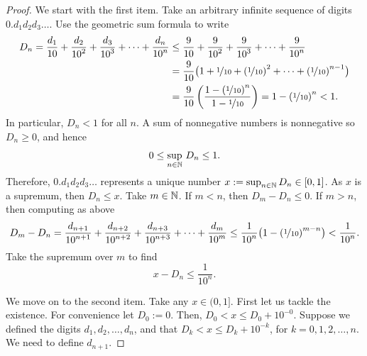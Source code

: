 \begin{proof}
We start with the first item.  Take an arbitrary infinite sequence of
digits $0.d_1d_2d_3\ldots$.  Use the geometric sum formula to write
\begin{equation*}
\begin{split}
D_n =
\frac{d_1}{10} + 
\frac{d_2}{{10}^2} + 
\frac{d_3}{{10}^3} + 
\cdots +
\frac{d_n}{{10}^n} 
& \leq
\frac{9}{10} + 
\frac{9}{{10}^2} + 
\frac{9}{{10}^3} + 
\cdots +
\frac{9}{{10}^n} 
\\
& =
\frac{9}{10}
\bigl( 1 + \nicefrac{1}{10} + 
{(\nicefrac{1}{10})}^2 + \cdots + 
{(\nicefrac{1}{10})}^{n-1} \bigr)
\\
& =
\frac{9}{10}
\left(
\frac{1-{(\nicefrac{1}{10})}^{n}}{1-\nicefrac{1}{10}}
\right)
= 1-{(\nicefrac{1}{10})}^{n}
< 1 .
\end{split}
\end{equation*}
In particular, $D_n < 1$ for all $n$.  A sum of nonnegative numbers is
nonnegative so $D_n \geq 0$, and hence
\begin{equation*}
0 \leq \sup_{n\in {\mathbb{N}}} \, D_n \leq 1 .
\end{equation*}
Therefore, $0.d_1d_2d_3\ldots$ represents a unique number $x := \sup_{n\in
{\mathbb{N}}} D_n \in [0,1]$.
As $x$ is a supremum, then $D_n \leq x$.
Take $m \in {\mathbb{N}}$.  If $m < n$, then $D_m - D_n \leq 0$.  If $m > n$, then
computing as above
\begin{equation*}
D_m - D_n
=
\frac{d_{n+1}}{{10}^{n+1}} + 
\frac{d_{n+2}}{{10}^{n+2}} + 
\frac{d_{n+3}}{{10}^{n+3}} + 
\cdots +
\frac{d_{m}}{{10}^m} 
\leq
\frac{1}{{10}^{n}}
\bigl(
1-{(\nicefrac{1}{10})}^{m-n}
\bigr)
<
\frac{1}{{10}^{n}} .
\end{equation*}
Take the supremum over $m$ to find
\begin{equation*}
x - D_n
\leq
\frac{1}{{10}^{n}} .
\end{equation*}

We move on to the
second item.  Take any $x \in (0,1]$.
First let us tackle the existence.
For convenience let $D_0 := 0$.
Then,
$D_0 < x \leq D_0 + {10}^{-0}$.
Suppose we defined the digits $d_1,d_2,\ldots,d_n$,
and that 
$D_k < x \leq D_k + {10}^{-k}$, for $k=0,1,2,\ldots,n$.  We need to define $d_{n+1}$.


\end{proof}
